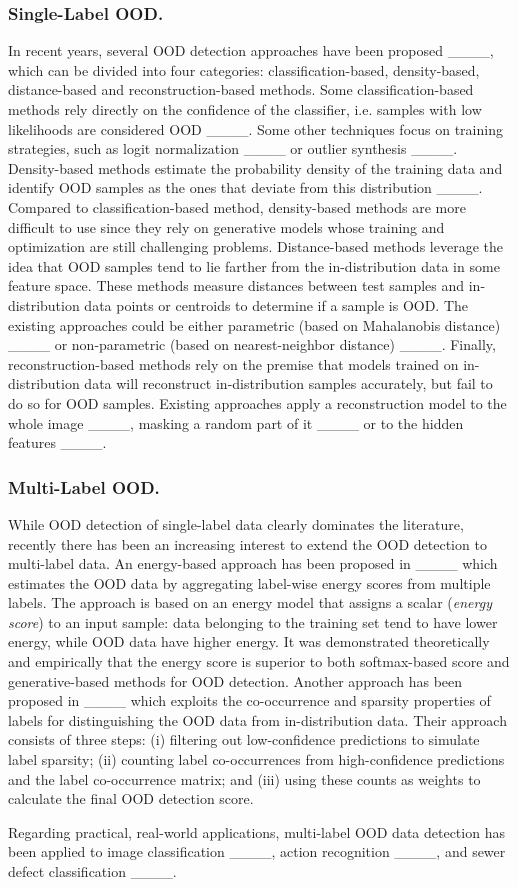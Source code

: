 \subsubsection{Single-Label OOD.}
In recent years, several OOD detection approaches have been proposed ____, which can be divided into four categories: classification-based, density-based, distance-based and reconstruction-based methods. Some classification-based methods rely directly on the confidence of the classifier, i.e. samples with low likelihoods are considered OOD ____. Some other techniques focus on training strategies, such as logit normalization ____ or outlier synthesis ____. Density-based methods estimate the probability density of the training data and identify OOD samples as the ones that deviate from this distribution ____. Compared to classification-based method, density-based methods are more difficult to use since they rely on generative models whose training and optimization are still challenging problems. Distance-based methods leverage the idea that OOD samples tend to lie farther from the in-distribution data in some feature space. These methods measure distances between test samples and in-distribution data points or centroids to determine if a sample is OOD. The existing approaches could be either parametric (based on Mahalanobis distance) ____ or non-parametric (based on nearest-neighbor distance) ____. Finally, reconstruction-based methods rely on the premise that models trained on in-distribution data will reconstruct in-distribution samples accurately, but fail to do so for OOD samples. Existing approaches apply a reconstruction model to the whole image ____, masking a random part of it ____ or to the hidden features ____.

\subsubsection{Multi-Label OOD.}
While OOD detection of single-label data clearly dominates the literature, recently there has been an increasing interest to extend the OOD detection to multi-label data. An energy-based approach has been proposed in ____ which estimates the OOD data by aggregating label-wise energy scores
from multiple labels. The approach is based on an energy model that assigns a scalar ({\it energy score}) to an input sample: data belonging to the training set tend to have lower energy, while OOD data have higher energy. It was demonstrated theoretically and empirically that the energy score is superior to both softmax-based score and
generative-based methods for OOD detection. 
Another approach has been proposed in ____ which exploits the co-occurrence and sparsity properties of labels for distinguishing the OOD data from in-distribution data. Their approach consists of three steps: (i) filtering out low-confidence predictions to simulate label sparsity; (ii) counting label co-occurrences from high-confidence predictions and the label co-occurrence matrix; and (iii) using these counts as weights to calculate the final OOD detection score.

Regarding practical, real-world applications, multi-label OOD data detection has been applied to image classification ____, action recognition ____, and sewer defect classification ____.